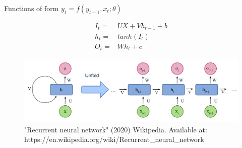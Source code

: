 \begin{frame}{Functions of form $y_t = f(y_{t-1}, x_t; \theta)$}

\begin{eqnarray}
I_t =& UX+Vh_{t-1}+b \\
h_t =& tanh(I_t) \\
O_t =& Wh_t + c 
\end{eqnarray}

\begin{center}
\begin{figure}
	\includegraphics[width=.8\textwidth]{figures/rnn_wikipedia_1}
	\caption*{\tiny{"Recurrent neural network" (2020) Wikipedia. Available at:
	https://en.wikipedia.org/wiki/Recurrent\_neural\_network}}
\end{figure}
\end{center}
\end{frame}

